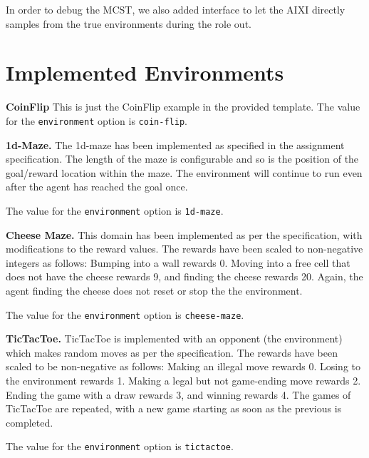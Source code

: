 \documentclass{article}
\let\Oldsection\section
\renewcommand{\section}{\FloatBarrier\Oldsection}
\begin{document}
\begin{flushleft}
In order to debug the MCST, we also added interface to let the AIXI directly samples from the true environments during the role out. \newline



\section{Implemented Environments}

\textbf{CoinFlip } This is just the CoinFlip example in the provided template. 
The value for the \verb|environment| option is \verb|coin-flip|.
\newline

\textbf{1d-Maze. } The 1d-maze has been implemented as specified in the assignment specification. The length of the maze is configurable and so is the position of the goal/reward location within the maze. The environment will continue to run even after the agent has reached the goal once. 

The value for the \verb|environment| option is \verb|1d-maze|.
\newline

\textbf{Cheese Maze. } This domain has been implemented as per the specification, with modifications to the reward values. The rewards have been scaled to non-negative integers as follows: Bumping into a wall rewards 0. Moving into a free cell that does not have the cheese rewards 9, and finding the cheese rewards 20. Again, the agent finding the cheese does not reset or stop the the environment. 

The value for the \verb|environment| option is \verb|cheese-maze|.
\newline

\textbf{TicTacToe. } TicTacToe is implemented with an opponent (the environment) which makes random moves as per the specification. The rewards have been scaled to be non-negative as follows: Making an illegal move rewards 0. Losing to the environment rewards 1. Making a legal but not game-ending move rewards 2. Ending the game with a draw rewards 3, and winning rewards 4. The games of TicTacToe are repeated, with a new game starting as soon as the previous is completed. 

The value for the \verb|environment| option is \verb|tictactoe|.
\newline


\end{flushleft}
\end{document}
